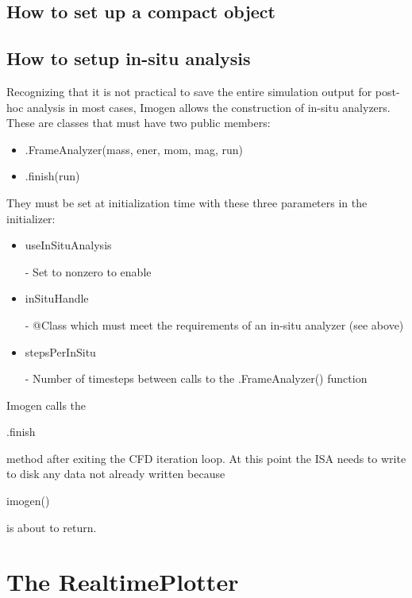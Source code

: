 \documentclass[letterpaper,12pt]{article}
\begin{document}
\subsection{How to set up a compact object}

\subsection{How to setup in-situ analysis}

Recognizing that it is not practical to save the entire simulation output for post-hoc analysis in
most cases, Imogen allows the construction of in-situ analyzers. These are classes that must have
two public members:
\begin{itemize}
\item \begin{tt}.FrameAnalyzer(mass, ener, mom, mag, run)\end{tt}
\item \begin{tt}.finish(run)\end{tt}
\end{itemize}

They must be set at initialization time with these three parameters in the initializer:
\begin{itemize}
\item \begin{tt}useInSituAnalysis\end{tt} - Set to nonzero to enable
\item \begin{tt}inSituHandle\end{tt} - @Class which must meet the requirements of an
in-situ analyzer (see above)
\item \begin{tt}stepsPerInSitu\end{tt} - Number of timesteps between calls to the .FrameAnalyzer() function
\end{itemize}

Imogen calls the \begin{tt}.finish\end{tt} method after exiting the CFD iteration loop. At this point the
ISA needs to write to disk any data not already written because \begin{tt}imogen()\end{tt} is about to 
return.

\section{The RealtimePlotter}
\end{document}
